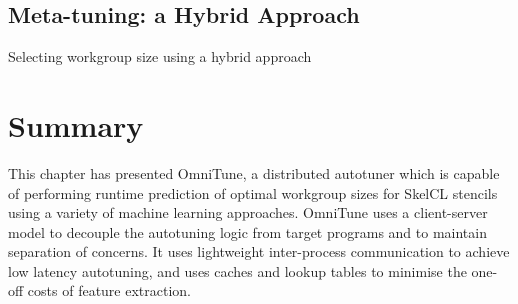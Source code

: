 \subsection{Meta-tuning: a Hybrid Approach}


\begin{algorithm}

\caption{Selecting workgroup size using a hybrid approach}
\label{alg:autotune-hybrid}
\end{algorithm}

\section{Summary}

This chapter has presented OmniTune, a distributed autotuner which is
capable of performing runtime prediction of optimal workgroup sizes
for SkelCL stencils using a variety of machine learning
approaches. OmniTune uses a client-server model to decouple the
autotuning logic from target programs and to maintain separation of
concerns. It uses lightweight inter-process communication to achieve
low latency autotuning, and uses caches and lookup tables to minimise
the one-off costs of feature extraction.
